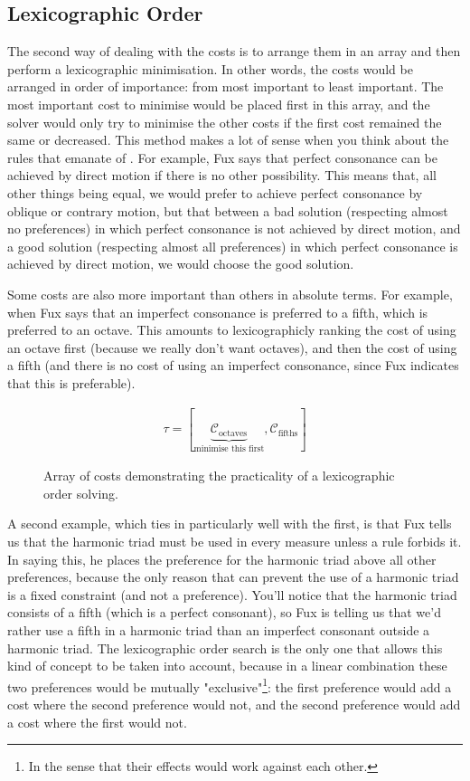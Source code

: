 \subsection{Lexicographic Order}\label{section:lexicographic-order}
The second way of dealing with the costs is to arrange them in an array and then perform a lexicographic minimisation. In other words, the costs would be arranged in order of importance: from most important to least important. The most important cost to minimise would be placed first in this array, and the solver would only try to minimise the other costs if the first cost remained the same or decreased. This method makes a lot of sense when you think about the rules that emanate of \gap. For example, Fux says that perfect consonance can be achieved by direct motion if there is no other possibility. This means that, all other things being equal, we would prefer to achieve perfect consonance by oblique or contrary motion, but that between a bad solution (respecting almost no preferences) in which perfect consonance is not achieved by direct motion, and a good solution (respecting almost all preferences) in which perfect consonance is achieved by direct motion, we would choose the good solution. 

Some costs are also more important than others in absolute terms. For example, when Fux says that an imperfect consonance is preferred to a fifth, which is preferred to an octave. This amounts to lexicographicly ranking the cost of using an octave first (because we really don't want octaves), and then the cost of using a fifth (and there is no cost of using an imperfect consonance, since Fux indicates that this is preferable).
\begin{figure}[h]
    \begin{equation}
        \begin{aligned}
            \tau = [\underset{\text{minimise this first}}{\underbrace{\mathcal{C}_\text{octaves}}}, \mathcal{C}_\text{fifths}]
        \end{aligned}
    \end{equation}
    \caption{Array of costs demonstrating the practicality of a lexicographic order solving.}
\end{figure}

A second example, which ties in particularly well with the first, is that Fux tells us that the harmonic triad must be used in every measure unless a rule forbids it. In saying this, he places the preference for the harmonic triad above all other preferences, because the only reason that can prevent the use of a harmonic triad is a fixed constraint (and not a preference). You'll notice that the harmonic triad consists of a fifth (which is a perfect consonant), so Fux is telling us that we'd rather use a fifth in a harmonic triad than an imperfect consonant outside a harmonic triad. The lexicographic order search is the only one that allows this kind of concept to be taken into account, because in a linear combination these two preferences would be mutually "exclusive"\footnote{In the sense that their effects would work against each other.}: the first preference would add a cost where the second preference would not, and the second preference would add a cost where the first would not.

